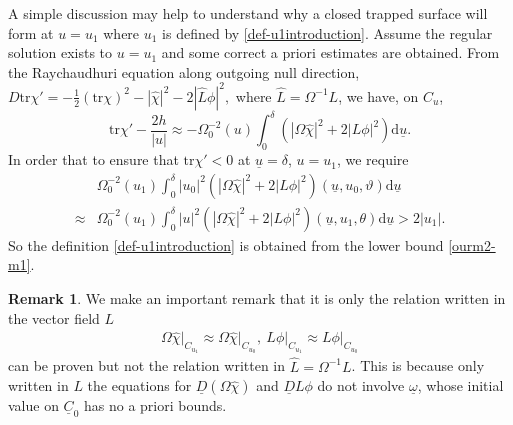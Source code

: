 \documentclass[11pt,reqno]{amsart}
\theoremstyle{definition}
\newtheorem{remark}{Remark}[section]
\numberwithin{equation}{section}
\newcommand{\D}{\mathrm{d}}
\newcommand{\tr}{\mathrm{tr}}
\def\chih{\widehat{\chi}}
\def\tr{\mathrm{tr}}
\def\omegab{\underline{\omega}}
\def\ub{\underline{u}}
\def\Cb{\underline{C}}
\newcommand{\Db}{\underline{D}}
\begin{document}
A simple discussion may help to understand why a closed trapped surface will form at $u=u_1$ where $u_1$ is defined by \eqref{def-u1introduction}. Assume the regular solution exists to $u=u_1$ and some correct a priori estimates are obtained. From the Raychaudhuri equation along outgoing null direction, $D\tr\chi'=-\frac{1}{2}(\tr\chi)^2-|\chih|^2-2|\widehat{L}\phi|^2,$
where $\widehat{L}=\Omega^{-1}L$, we have, on $C_u$,
$$\tr\chi'-\frac{2h}{|u|}\approx-\Omega_0^{-2}(u)\int_0^\delta(|\Omega\chih|^2+2|L\phi|^2)\D\ub.$$
In order that to ensure that $\tr\chi'<0$ at $\ub=\delta$, $u=u_1$, we require
\begin{align*}
&\Omega_0^{-2}(u_1)\int_0^\delta|u_0|^2(|\Omega\chih|^2+2|L\phi|^2)(\ub,u_0,\vartheta)\D\ub\\
\approx&\Omega_0^{-2}(u_1)\int_0^\delta|u|^2(|\Omega\chih|^2+2|L\phi|^2)(\ub,u_1,\theta)\D\ub>2|u_1|.
\end{align*}
So the definition \eqref{def-u1introduction} is obtained from the lower bound \eqref{ourm2-m1}. 
\begin{remark}\label{aboutomegab-intro}We make an important remark that it is only the relation written in the vector field $L$
\begin{align*}
\Omega\chih\big|_{C_{u_1}}\approx\Omega\chih\big|_{C_{u_0}},\  L\phi\big|_{C_{u_1}}\approx L\phi\big|_{C_{u_0}}
\end{align*}
can be proven but not the relation written in $\widehat{L}=\Omega^{-1}L$. This is because only written in $L$ the equations for $\Db(\Omega\chih)$ and $\Db L\phi$ do not involve $\omegab$, whose initial value on $\Cb_0$ has no a priori bounds.
\end{remark}
\end{document}
